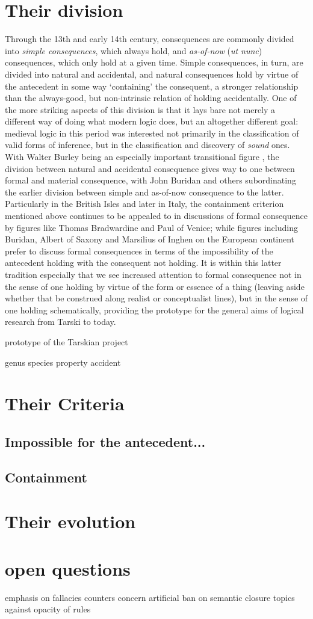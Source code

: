 \documentclass[]{article}
\begin{document}
\section{Their division}
Through the 13th and early 14th century, 
consequences are commonly divided into \emph{simple consequences}, 
which always hold, 
and \emph{as-of-now} (\emph{ut nunc}) consequences, 
which only hold at a given time. 
Simple consequences, 
in turn, 
are divided into natural and accidental, 
and natural consequences hold by virtue of the antecedent in some way `containing' the consequent, 
a stronger relationship than the always-good, 
but non-intrinsic relation of holding accidentally. 
One of the more striking aspects of this division is that it lays bare not merely a different way of doing what modern logic does, 
but an altogether different goal: 
medieval logic in this period was interested not primarily in the classification of valid forms of inference, 
but in the classification and discovery of \emph{sound} ones. 
With Walter Burley being an especially important transitional figure \autocite{Archambault2018b}, 
the division between natural and accidental consequence gives way to one between formal and material consequence, 
with John Buridan and others subordinating the earlier division between simple and as-of-now consequence to the latter. 
Particularly in the British Isles and later in Italy, 
the containment criterion mentioned above continues to be appealed to in discussions of formal consequence by figures like Thomas Bradwardine and Paul of Venice; 
while figures including Buridan, 
Albert of Saxony 
and Marsilius of Inghen on the European continent prefer to discuss formal consequences in terms of the impossibility of the antecedent holding with the consequent not holding. 
It is within this latter tradition especially that we see increased attention to formal consequence not in the sense of one holding by virtue of the form or essence of a thing 
(leaving aside whether that be construed along realist or conceptualist lines), 
but in the sense of one holding schematically, providing the prototype for the general aims of logical research from Tarski to today. 

prototype of the Tarskian project 

genus
species 
property
accident
\section{Their Criteria}
\subsection{Impossible for the antecedent...}

\subsection{Containment}



\section{Their evolution}

\section{open questions}
emphasis on fallacies counters concern artificial ban on semantic closure
topics against opacity of rules
\printbibliography
\end{document}
